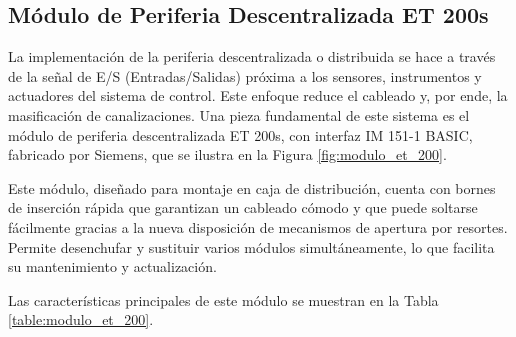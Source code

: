 \subsection{Módulo de Periferia Descentralizada ET 200s} \label{sec:moduloEt200}

La implementación de la periferia descentralizada o distribuida se hace a través de la señal de E/S (Entradas/Salidas) próxima a los sensores, instrumentos y actuadores del sistema de control. Este enfoque reduce el cableado y, por ende, la masificación de canalizaciones. Una pieza fundamental de este sistema es el módulo de periferia descentralizada ET 200s, con interfaz IM 151-1 BASIC, fabricado por Siemens, que se ilustra en la Figura \ref{fig:modulo_et_200}.


Este módulo, diseñado para montaje en caja de distribución, cuenta con bornes de inserción rápida que garantizan un cableado cómodo y que puede soltarse fácilmente gracias a la nueva disposición de mecanismos de apertura por resortes. Permite desenchufar y sustituir varios módulos simultáneamente, lo que facilita su mantenimiento y actualización.

Las características principales de este módulo se muestran en la Tabla \ref{table:modulo_et_200}.



